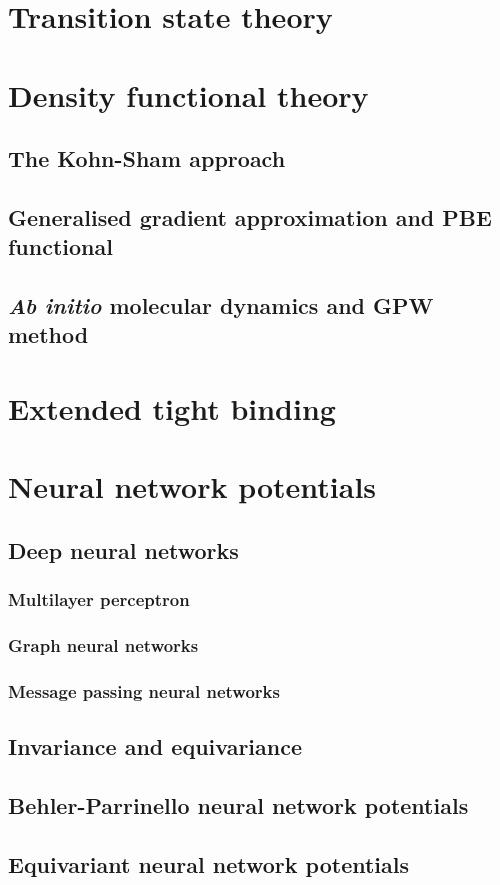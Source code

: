 \section{Transition state theory}



\section{Density functional theory}

\subsection{The Kohn-Sham approach}

\subsection{Generalised gradient approximation and PBE functional}

\subsection{\textit{Ab initio} molecular dynamics and GPW method}



\section{Extended tight binding}



\section{Neural network potentials}

\subsection{Deep neural networks}

\subsubsection{Multilayer perceptron}

\subsubsection{Graph neural networks}

\subsubsection{Message passing neural networks}

\subsection{Invariance and equivariance}

\subsection{Behler-Parrinello neural network potentials}

\subsection{Equivariant neural network potentials}